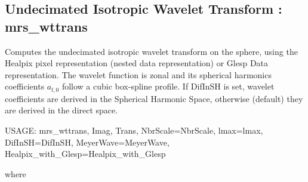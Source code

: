 \subsection{Undecimated Isotropic Wavelet Transform : mrs\_wttrans}
Computes the undecimated isotropic wavelet transform on the sphere, using the Healpix pixel representation (nested data representation) or 
Glesp Data representation. The wavelet function is zonal and its spherical harmonics coefficients $a_{l,0}$ follow a cubic box-spline profile. 
If DifInSH is set, wavelet coefficients are derived in the Spherical Harmonic Space, otherwise (default) they are derived in the direct space.
{\bf
\begin{center}
     USAGE: mrs\_wttrans, Imag, Trans, NbrScale=NbrScale, lmax=lmax, DifInSH=DifInSH, MeyerWave=MeyerWave, Healpix\_with\_Glesp=Healpix\_with\_Glesp 
\end{center}}
where 
